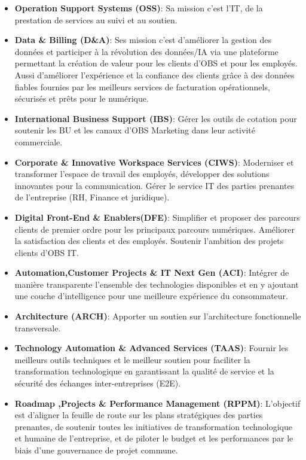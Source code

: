 \begin{itemize}
    \item \textbf{Operation Support Systems (OSS)}: Sa mission c’est l’IT, de la prestation de services au suivi et au soutien.
    \item \textbf{Data \& Billing (D\&A)}: Ses mission c’est d’améliorer la gestion des données et participer à la révolution des données/IA via une plateforme permettant la création de valeur pour les clients d’OBS et pour les employés. Aussi d’améliorer l’expérience et la confiance des clients grâce à des données fiables fournies par les meilleurs services de facturation opérationnels, sécurisés et prêts pour le numérique.
    \item \textbf{International Business Support (IBS)}: Gérer les outils de cotation pour soutenir les BU et les canaux d’OBS Marketing dans leur activité commerciale.
    \item \textbf{Corporate \& Innovative Workspace Services (CIWS)}: Moderniser et transformer l’espace de travail des employés, développer des solutions innovantes pour la communication. Gérer le service IT des parties prenantes de l’entreprise (RH, Finance et juridique).
    \item \textbf{Digital Front-End \& Enablers(DFE)}: Simplifier et proposer des parcours clients de premier ordre pour les principaux parcours numériques. Améliorer la satisfaction des clients et des employés. Soutenir l’ambition des projets clients d’OBS IT.
    \item \textbf{Automation,Customer Projects \& IT Next Gen (ACI)}: Intégrer de manière transparente l’ensemble des technologies disponibles et en y ajoutant une couche d’intelligence pour une meilleure expérience du consommateur.
    \item \textbf{Architecture (ARCH)}: Apporter un soutien sur l’architecture fonctionnelle transversale.
    \item \textbf{Technology Automation \& Advanced Services (TAAS)}: Fournir les meilleurs outils techniques et le meilleur soutien pour faciliter la transformation technologique en garantissant la qualité de service et la sécurité des échanges inter-entreprises (E2E).
    \item \textbf{Roadmap ,Projects \& Performance Management (RPPM)}: L’objectif est d’aligner la feuille de route sur les plans stratégiques des parties prenantes, de soutenir toutes les initiatives de transformation technologique et humaine de l’entreprise, et de piloter le budget et les performances par le biais d’une gouvernance de projet commune.
\end{itemize}

